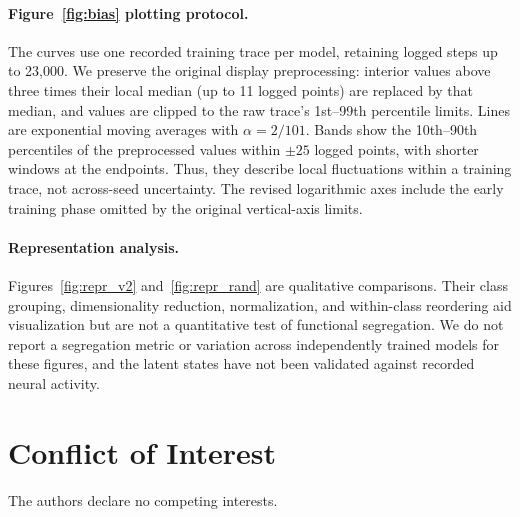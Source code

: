 \documentclass[a4paper]{easychair}
\begin{document}
\paragraph{Figure~\ref{fig:bias} plotting protocol.}
The curves use one recorded training trace per model, retaining logged steps up to 23,000. We preserve the original display preprocessing: interior values above three times their local median (up to 11 logged points) are replaced by that median, and values are clipped to the raw trace's 1st--99th percentile limits. Lines are exponential moving averages with $\alpha=2/101$. Bands show the 10th--90th percentiles of the preprocessed values within $\pm25$ logged points, with shorter windows at the endpoints. Thus, they describe local fluctuations within a training trace, not across-seed uncertainty. The revised logarithmic axes include the early training phase omitted by the original vertical-axis limits.

\paragraph{Representation analysis.}
Figures~\ref{fig:repr_v2} and~\ref{fig:repr_rand} are qualitative comparisons. Their class grouping, dimensionality reduction, normalization, and within-class reordering aid visualization but are not a quantitative test of functional segregation. We do not report a segregation metric or variation across independently trained models for these figures, and the latent states have not been validated against recorded neural activity.

\section*{Conflict of Interest}
The authors declare no competing interests.
\end{document}
